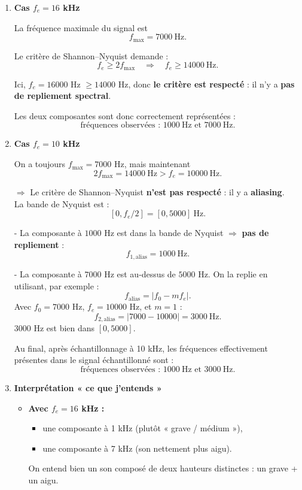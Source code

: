 \begin{enumerate}[label=(\alph*)]

\item \textbf{Cas $f_e = 16$ kHz}

La fréquence maximale du signal est
\[
f_{\max} = 7000~\text{Hz}.
\]

Le critère de Shannon–Nyquist demande :
\[
f_e \ge 2 f_{\max} \quad \Rightarrow \quad f_e \ge 14000~\text{Hz}.
\]

Ici, $f_e = 16000$ Hz $\ge 14000$ Hz, donc \textbf{le critère est respecté} :  
il n’y a \textbf{pas de repliement spectral}.

Les deux composantes sont donc correctement représentées :
\[
\text{fréquences observées : } 1000~\text{Hz et } 7000~\text{Hz}.
\]

\item \textbf{Cas $f_e = 10$ kHz}

On a toujours $f_{\max} = 7000$ Hz, mais maintenant
\[
2 f_{\max} = 14000~\text{Hz} > f_e = 10000~\text{Hz}.
\]

$\Rightarrow$ Le critère de Shannon–Nyquist \textbf{n’est pas respecté} : il y a \textbf{aliasing}. \\

La bande de Nyquist est :
\[
[0, f_e/2] = [0, 5000]~\text{Hz}.
\]

- La composante à $1000$ Hz est dans la bande de Nyquist $\Rightarrow$ \textbf{pas de repliement} :
  \[
    f_{1,\text{alias}} = 1000~\text{Hz}.
  \]

- La composante à $7000$ Hz est au-dessus de $5000$ Hz.  
  On la replie en utilisant, par exemple :
  \[
    f_{\text{alias}} = |f_0 - m f_e|.
  \]
  Avec $f_0 = 7000$ Hz, $f_e = 10000$ Hz, et $m=1$ :
  \[
    f_{2,\text{alias}} = |7000 - 10000| = 3000~\text{Hz}.
  \]
  $3000$ Hz est bien dans $[0, 5000]$.

Au final, après échantillonnage à 10 kHz, les fréquences effectivement présentes dans le signal échantillonné sont :
\[
\text{fréquences observées : } 1000~\text{Hz et } 3000~\text{Hz}.
\]

\item \textbf{Interprétation « ce que j’entends »}

\begin{itemize}
    \item \textbf{Avec $f_e = 16$ kHz :}
    \begin{itemize}
        \item une composante à 1 kHz (plutôt « grave / médium »),
        \item une composante à 7 kHz (son nettement plus aigu).
    \end{itemize}
    On entend bien un son composé de deux hauteurs distinctes : un grave + un aigu.


\end{itemize}
\end{enumerate}
